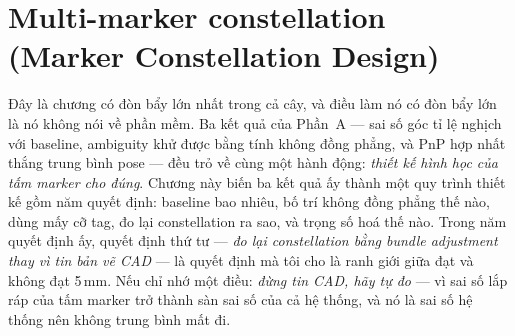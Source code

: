 \documentclass[../../marker.tex]{subfiles}
\begin{document}
\chapter{Multi-marker constellation (Marker Constellation Design)}

\begin{tomtat}
Đây là chương có đòn bẩy lớn nhất trong cả cây, và điều làm nó có đòn bẩy lớn là nó không nói về phần mềm. Ba kết quả của Phần~A --- sai số góc tỉ lệ nghịch với baseline, ambiguity khử được bằng tính không đồng phẳng, và PnP hợp nhất thắng trung bình pose --- đều trỏ về cùng một hành động: \emph{thiết kế hình học của tấm marker cho đúng}. Chương này biến ba kết quả ấy thành một quy trình thiết kế gồm năm quyết định: baseline bao nhiêu, bố trí không đồng phẳng thế nào, dùng mấy cỡ tag, đo lại constellation ra sao, và trọng số hoá thế nào. Trong năm quyết định ấy, quyết định thứ tư --- \emph{đo lại constellation bằng bundle adjustment thay vì tin bản vẽ CAD} --- là quyết định mà tôi cho là ranh giới giữa đạt và không đạt 5\,mm. Nếu chỉ nhớ một điều: \emph{đừng tin CAD, hãy tự đo} --- vì sai số lắp ráp của tấm marker trở thành sàn sai số của cả hệ thống, và nó là sai số hệ thống nên không trung bình mất đi.
\end{tomtat}
\end{document}
